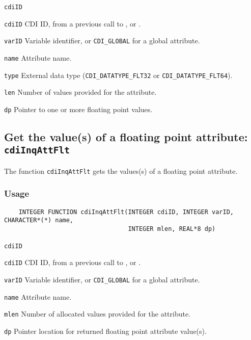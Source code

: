 \hspace*{4mm}\begin{minipage}[]{15cm}
\begin{deflist}{\texttt{cdiID}\ }
\item[\texttt{cdiID}]
CDI ID, from a previous call to {}, {} or {}.
\item[\texttt{varID}]
Variable identifier, or {\texttt{CDI\_GLOBAL}} for a global attribute.
\item[\texttt{name}]
Attribute name.
\item[\texttt{type}]
External data type ({\texttt{CDI\_DATATYPE\_FLT32}} or {\texttt{CDI\_DATATYPE\_FLT64}}).
\item[\texttt{len}]
Number of values provided for the attribute.
\item[\texttt{dp}]
Pointer to one or more floating point values.

\end{deflist}
\end{minipage}


\subsection{Get the value(s) of a floating point attribute: \texttt{cdiInqAttFlt}}
\label{cdiInqAttFlt}

The function {\texttt{cdiInqAttFlt}} gets the values(s) of a floating point attribute.

\subsubsection*{Usage}

\begin{verbatim}
    INTEGER FUNCTION cdiInqAttFlt(INTEGER cdiID, INTEGER varID, CHARACTER*(*) name, 
                                  INTEGER mlen, REAL*8 dp)
\end{verbatim}

\hspace*{4mm}\begin{minipage}[]{15cm}
\begin{deflist}{\texttt{cdiID}\ }
\item[\texttt{cdiID}]
CDI ID, from a previous call to {}, {} or {}.
\item[\texttt{varID}]
Variable identifier, or {\texttt{CDI\_GLOBAL}} for a global attribute.
\item[\texttt{name}]
Attribute name.
\item[\texttt{mlen}]
Number of allocated values provided for the attribute.
\item[\texttt{dp}]
Pointer location for returned floating point attribute value(s).

\end{deflist}
\end{minipage}
